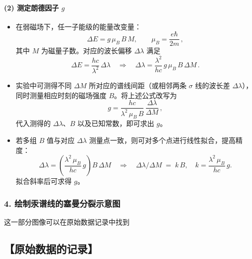 \documentclass[12pt,a4paper,UTF8]{ctexart}
\begin{document}
\paragraph{(2) 测定朗德因子 $g$}  
\begin{itemize}
  \item 在弱磁场下，任一子能级的能量改变量：
  \[
    \Delta E = g\,\mu_B\,B\,M,
    \qquad \mu_B = \frac{e\hbar}{2m}\,,
  \]
  其中 $M$ 为磁量子数。对应的波长偏移 $\Delta \lambda$ 满足
  \[
    \Delta E = \frac{hc}{\lambda^2}\,\Delta \lambda 
    \quad\Longrightarrow\quad 
    \Delta \lambda = \frac{\lambda^2}{hc}\,g\,\mu_B\,B\,\Delta M\,.
  \]
  \item 实验中可测得不同 $\Delta M$ 所对应的谱线间距（或相邻两条 $\sigma$ 线的波长差 $\Delta \lambda$），同时测量相应时刻的磁场强度 $B$。将上述公式改写为
  \[
    g = \frac{hc}{\lambda^2\,\mu_B\,B}\,\frac{\Delta \lambda}{\Delta M}\,,
  \]
  代入测得的 $\Delta \lambda$、$B$ 以及已知常数，即可求出 $g$。  
  \item 若多组 $B$ 值与对应 $\Delta \lambda$ 测量点一致，则可对多个点进行线性拟合，提高精度：  
  \[
    \Delta \lambda = \left( \frac{\lambda^2\,\mu_B}{hc} \,g \right) B \,\Delta M
    \quad\Longrightarrow\quad
    \Delta \lambda \big/ \Delta M \;=\; k \, B, 
    \quad k = \frac{\lambda^2\,\mu_B}{hc}\,g.
  \]
  拟合斜率后可求得 $g$。  
\end{itemize}

\subsubsection*{4. 绘制汞谱线的塞曼分裂示意图}
这一部分图像可以在原始数据记录中找到



\subsection*{【原始数据的记录】}

\end{document}
